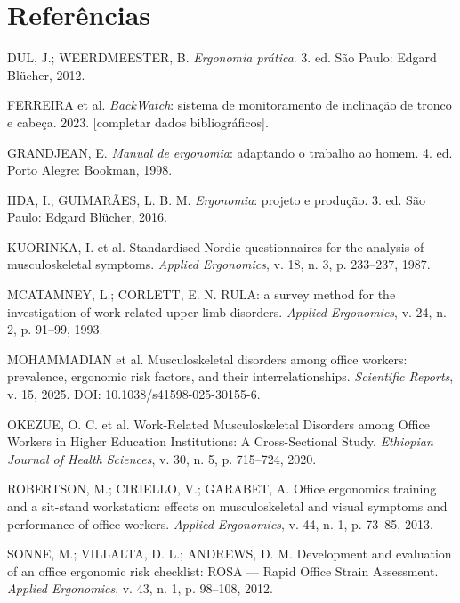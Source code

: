 \documentclass[12pt,a4paper]{article}
\begin{document}
\section*{Referências}
\begin{singlespace}
\setlength{\parindent}{0pt}
\setlength{\parskip}{0.6em}

DUL, J.; WEERDMEESTER, B. \emph{Ergonomia prática}. 3. ed. São Paulo: Edgard
Blücher, 2012.

FERREIRA et al. \emph{BackWatch}: sistema de monitoramento de inclinação de
tronco e cabeça. 2023. [completar dados bibliográficos].

GRANDJEAN, E. \emph{Manual de ergonomia}: adaptando o trabalho ao homem. 4. ed.
Porto Alegre: Bookman, 1998.

IIDA, I.; GUIMARÃES, L. B. M. \emph{Ergonomia}: projeto e produção. 3. ed. São
Paulo: Edgard Blücher, 2016.

KUORINKA, I. et al. Standardised Nordic questionnaires for the analysis of
musculoskeletal symptoms. \emph{Applied Ergonomics}, v. 18, n. 3, p. 233--237,
1987.

MCATAMNEY, L.; CORLETT, E. N. RULA: a survey method for the investigation of
work-related upper limb disorders. \emph{Applied Ergonomics}, v. 24, n. 2,
p. 91--99, 1993.

MOHAMMADIAN et al. Musculoskeletal disorders among office workers: prevalence,
ergonomic risk factors, and their interrelationships. \emph{Scientific Reports},
v. 15, 2025. DOI: 10.1038/s41598-025-30155-6.

OKEZUE, O. C. et al. Work-Related Musculoskeletal Disorders among Office Workers
in Higher Education Institutions: A Cross-Sectional Study. \emph{Ethiopian
Journal of Health Sciences}, v. 30, n. 5, p. 715--724, 2020.

ROBERTSON, M.; CIRIELLO, V.; GARABET, A. Office ergonomics training and a
sit-stand workstation: effects on musculoskeletal and visual symptoms and
performance of office workers. \emph{Applied Ergonomics}, v. 44, n. 1,
p. 73--85, 2013.

SONNE, M.; VILLALTA, D. L.; ANDREWS, D. M. Development and evaluation of an
office ergonomic risk checklist: ROSA --- Rapid Office Strain Assessment.
\emph{Applied Ergonomics}, v. 43, n. 1, p. 98--108, 2012.
\end{singlespace}
\end{document}
